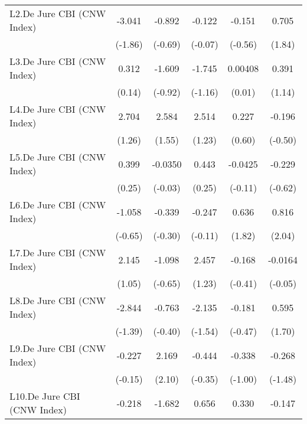 {\begin{tabular}{l*{5}{c}}
L2.De Jure CBI (CNW Index)&   -3.041         &   -0.892         &   -0.122         &   -0.151         &    0.705         \\
                &  (-1.86)         &  (-0.69)         &  (-0.07)         &  (-0.56)         &   (1.84)         \\
[1em]
L3.De Jure CBI (CNW Index)&    0.312         &   -1.609         &   -1.745         &  0.00408         &    0.391         \\
                &   (0.14)         &  (-0.92)         &  (-1.16)         &   (0.01)         &   (1.14)         \\
[1em]
L4.De Jure CBI (CNW Index)&    2.704         &    2.584         &    2.514         &    0.227         &   -0.196         \\
                &   (1.26)         &   (1.55)         &   (1.23)         &   (0.60)         &  (-0.50)         \\
[1em]
L5.De Jure CBI (CNW Index)&    0.399         &  -0.0350         &    0.443         &  -0.0425         &   -0.229         \\
                &   (0.25)         &  (-0.03)         &   (0.25)         &  (-0.11)         &  (-0.62)         \\
[1em]
L6.De Jure CBI (CNW Index)&   -1.058         &   -0.339         &   -0.247         &    0.636         &    0.816\sym{*}  \\
                &  (-0.65)         &  (-0.30)         &  (-0.11)         &   (1.82)         &   (2.04)         \\
[1em]
L7.De Jure CBI (CNW Index)&    2.145         &   -1.098         &    2.457         &   -0.168         &  -0.0164         \\
                &   (1.05)         &  (-0.65)         &   (1.23)         &  (-0.41)         &  (-0.05)         \\
[1em]
L8.De Jure CBI (CNW Index)&   -2.844         &   -0.763         &   -2.135         &   -0.181         &    0.595         \\
                &  (-1.39)         &  (-0.40)         &  (-1.54)         &  (-0.47)         &   (1.70)         \\
[1em]
L9.De Jure CBI (CNW Index)&   -0.227         &    2.169\sym{*}  &   -0.444         &   -0.338         &   -0.268         \\
                &  (-0.15)         &   (2.10)         &  (-0.35)         &  (-1.00)         &  (-1.48)         \\
[1em]
L10.De Jure CBI (CNW Index)&   -0.218         &   -1.682\sym{**} &    0.656         &    0.330         &   -0.147         \\

\end{tabular}}
